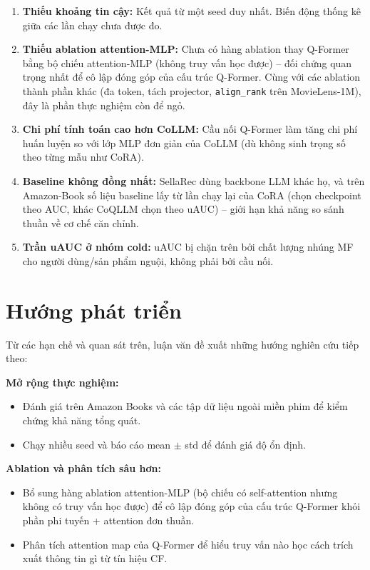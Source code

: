 \begin{enumerate}
    \item \textbf{Thiếu khoảng tin cậy:} Kết quả từ một seed duy nhất. Biến động thống
    kê giữa các lần chạy chưa được đo.

    \item \textbf{Thiếu ablation attention-MLP:} Chưa có hàng ablation thay Q-Former bằng
    bộ chiếu attention-MLP (không truy vấn học được) -- đối chứng quan trọng nhất để cô lập
    đóng góp của cấu trúc Q-Former. Cùng với các ablation thành phần khác (đa token, tách
    projector, \texttt{align\_rank} trên MovieLens-1M), đây là phần thực nghiệm còn để ngỏ.

    \item \textbf{Chi phí tính toán cao hơn CoLLM:} Cầu nối Q-Former làm tăng chi phí huấn
    luyện so với lớp MLP đơn giản của CoLLM (dù không sinh trọng số theo từng mẫu như CoRA).

    \item \textbf{Baseline không đồng nhất:} SellaRec dùng backbone LLM khác họ, và trên
    Amazon-Book số liệu baseline lấy từ lần chạy lại của CoRA (chọn checkpoint theo AUC,
    khác CoQLLM chọn theo uAUC) -- giới hạn khả năng so sánh thuần về cơ chế căn chỉnh.

    \item \textbf{Trần uAUC ở nhóm cold:} uAUC bị chặn trên bởi chất lượng nhúng MF cho
    người dùng/sản phẩm nguội, không phải bởi cầu nối.
\end{enumerate}

\section{Hướng phát triển}
\label{sec:huong-phat-trien}

Từ các hạn chế và quan sát trên, luận văn đề xuất những hướng nghiên cứu tiếp theo:

\textbf{Mở rộng thực nghiệm:}
\begin{itemize}
    \item Đánh giá trên Amazon Books và các tập dữ liệu ngoài miền phim để kiểm chứng
    khả năng tổng quát.
    \item Chạy nhiều seed và báo cáo mean $\pm$ std để đánh giá độ ổn định.
\end{itemize}

\textbf{Ablation và phân tích sâu hơn:}
\begin{itemize}
    \item Bổ sung hàng ablation attention-MLP (bộ chiếu có self-attention nhưng không có
    truy vấn học được) để cô lập đóng góp của cấu trúc Q-Former khỏi phần phi tuyến +
    attention đơn thuần.
    \item Phân tích attention map của Q-Former để hiểu truy vấn nào học cách trích xuất
    thông tin gì từ tín hiệu CF.
\end{itemize}

